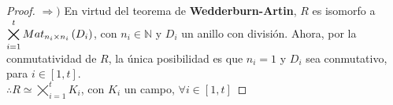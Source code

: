 \documentclass{article}
\begin{document}
\begin{enumerate}[label=\textbf{Ej \arabic*.}]
\begin{proof}
		$\boxed{\Rightarrow )}$ En virtud del teorema de \textbf{Wedderburn-Artin}, $R$ es isomorfo a $\displaystyle\bigtimes_{i=1}^{t} Mat_{n_{i} \times n_{i}} \left(D_{i}\right)$, con $n_{i}\in\mathbb{N}$ y $D_{i}$ un anillo con división. Ahora, por la conmutatividad de $R$, la única posibilidad es que $n_{i}=1$ y $D_{i}$ sea conmutativo, para $i \in [1,t]$.\\
		$\therefore R \simeq \displaystyle\bigtimes_{i=1}^{t} K_{i}$, con $K_{i}$ un campo, $\forall i \in [1,t]$
	\end{proof}
\end{enumerate}
\end{document}
